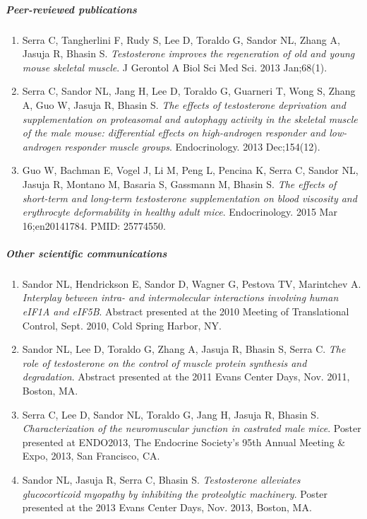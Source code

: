 \documentclass[12pt,english]{report}\usepackage[]{graphicx}\usepackage[]{color}
\begin{document}
\subparagraph*{Peer-reviewed publications}
\begin{enumerate}
\item Serra C, Tangherlini F, Rudy S, Lee D, Toraldo G, Sandor NL, Zhang
A, Jasuja R, Bhasin S. \emph{Testosterone improves the regeneration
of old and young mouse skeletal muscle}. J Gerontol A Biol Sci Med
Sci. 2013 Jan;68(1).
\item Serra C, Sandor NL, Jang H, Lee D, Toraldo G, Guarneri T, Wong S,
Zhang A, Guo W, Jasuja R, Bhasin S. \emph{The effects of testosterone
deprivation and supplementation on proteasomal and autophagy activity
in the skeletal muscle of the male mouse: differential effects on
high-androgen responder and low-androgen responder muscle groups}.
Endocrinology. 2013 Dec;154(12).
\item Guo W, Bachman E, Vogel J, Li M, Peng L, Pencina K, Serra C, Sandor
NL, Jasuja R, Montano M, Basaria S, Gassmann M, Bhasin S. \emph{The
effects of short-term and long-term testosterone supplementation on
blood viscosity and erythrocyte deformability in healthy adult mice}.
Endocrinology. 2015 Mar 16;en20141784. PMID: 25774550.
\end{enumerate}

\subparagraph*{Other scientific communications}
\begin{enumerate}
\item Sandor NL, Hendrickson E, Sandor D, Wagner G, Pestova TV, Marintchev
A. \emph{Interplay between intra- and intermolecular interactions
involving human eIF1A and eIF5B}. Abstract presented at the 2010 Meeting
of Translational Control, Sept. 2010, Cold Spring Harbor, NY.
\item Sandor NL, Lee D, Toraldo G, Zhang A, Jasuja R, Bhasin S, Serra C.
\emph{The role of testosterone on the control of muscle protein synthesis
and degradation}. Abstract presented at the 2011 Evans Center Days,
Nov. 2011, Boston, MA.
\item Serra C, Lee D, Sandor NL, Toraldo G, Jang H, Jasuja R, Bhasin S.
\emph{Characterization of the neuromuscular junction in castrated
male mice}. Poster presented at ENDO2013, The Endocrine Society's
95th Annual Meeting \& Expo, 2013, San Francisco, CA.
\item Sandor NL, Jasuja R, Serra C, Bhasin S. \emph{Testosterone alleviates
glucocorticoid myopathy by inhibiting the proteolytic machinery}.
Poster presented at the 2013 Evans Center Days, Nov. 2013, Boston,
MA.
\end{enumerate}
\end{document}
